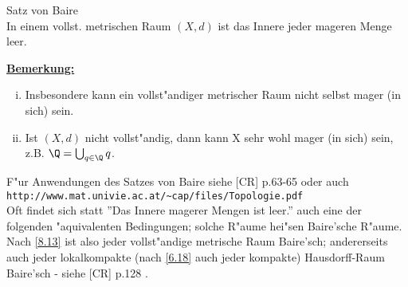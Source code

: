 \begin{satz}\label{8.13}{\sc Satz von Baire}\\
In einem vollst. metrischen Raum $(X,d)$ ist das Innere jeder mageren Menge leer.
\end{satz}
\ul{\bf Bemerkung:}
\begin{enumerate}[(i)]
\item Insbesondere kann ein vollst"andiger metrischer Raum nicht selbst mager (in sich) sein.
\item Ist $(X,d)$ nicht vollst"andig, dann kann X sehr wohl mager (in sich) sein, z.B. $\Q =\bigcup_{q\in\Q} q$.
\end{enumerate}
F"ur Anwendungen des Satzes von {\sc Baire} siehe [CR] p.63-65 oder auch\\
\verb*|http://www.mat.univie.ac.at/~cap/files/Topologie.pdf|\\
Oft findet sich statt ''Das Innere magerer Mengen ist leer.'' auch eine der folgenden "aquivalenten Bedingungen; solche R"aume hei"sen {\sc Baire}'sche R"aume. Nach \ref{8.13} ist also jeder vollst"andige metrische Raum {\sc Baire}'sch; andererseits auch jeder lokalkompakte (nach \ref{6.18} auch jeder kompakte) {\sc Hausdorff}-Raum {\sc Baire}'sch - siehe [CR] p.128 .

